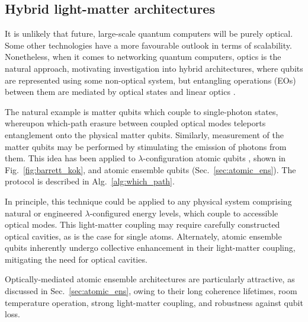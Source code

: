 

%
%

\subsection{Hybrid light-matter architectures} \label{sec:hybrid} 

It is unlikely that future, large-scale quantum computers will be purely optical. Some other technologies have a more favourable outlook in terms of scalability. Nonetheless, when it comes to networking quantum computers, optics is the natural approach, motivating investigation into hybrid architectures, where qubits are represented using some non-optical system, but entangling operations (EOs) between them are mediated by optical states and linear optics \cite{bib:Duan06, bib:Beugnon06}.

The natural example is matter qubits which couple to single-photon states, whereupon which-path erasure between coupled optical modes teleports entanglement onto the physical matter qubits. Similarly, measurement of the matter qubits may be performed by stimulating the emission of photons from them. This idea has been applied to $\lambda$-configuration atomic qubits \cite{bib:BarrettKok05}, shown in Fig.~\ref{fig:barrett_kok}, and atomic ensemble qubits \cite{bib:RohdeAtEns10} (Sec.~\ref{sec:atomic_ens}). The protocol is described in Alg.~\ref{alg:which_path}.

In principle, this technique could be applied to any physical system comprising natural or engineered $\lambda$-configured energy levels, which couple to accessible optical modes. This light-matter coupling may require carefully constructed optical cavities, as is the case for single atoms. Alternately, atomic ensemble qubits inherently undergo collective enhancement in their light-matter coupling, mitigating the need for optical cavities.

Optically-mediated atomic ensemble architectures are particularly attractive, as discussed in Sec.~\ref{sec:atomic_ens}, owing to their long coherence lifetimes, room temperature operation, strong light-matter coupling, and robustness against qubit loss.

